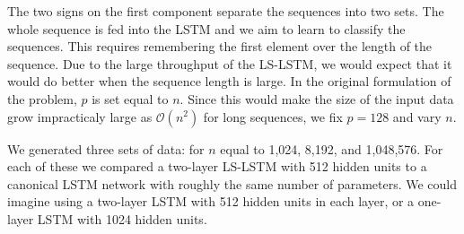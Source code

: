 \documentclass{article}
\begin{document}
The two signs on the first component separate the sequences into two
sets. The whole sequence is fed into the LSTM and we aim to learn to classify
the sequences. This requires remembering the first element over the length of
the sequence. Due to the large throughput of the LS-LSTM, we would expect that
it would do better when the sequence length is large. In the original
formulation of the problem, \(p\) is set equal to \(n\). Since this would make
the size of the input data grow impracticaly large as \(\mathcal{O}(n^2)\) for
long sequences, we fix \(p = 128\) and vary \(n\).

We generated three sets of data: for \(n\) equal to 1,024, 8,192, and
1,048,576. For each of these we compared a two-layer LS-LSTM with 512 hidden
units to a canonical LSTM network with roughly the same number of parameters. We
could imagine using a two-layer LSTM with 512 hidden units in each layer, or a
one-layer LSTM with 1024 hidden units.
\end{document}
